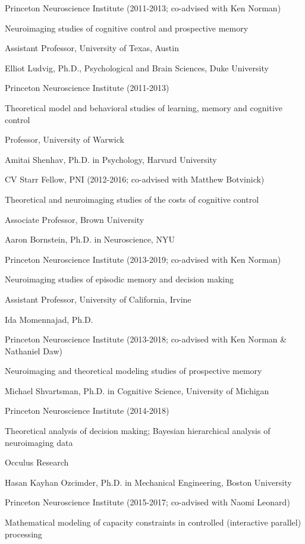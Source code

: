 \documentclass[10 pt]{article}
\begin{document}
Princeton Neuroscience Institute (2011-2013; co-advised with Ken Norman)

Neuroimaging studies of cognitive control and prospective memory

Assistant Professor, University of Texas, Austin
    \medskip

Elliot Ludvig, Ph.D., Psychological and Brain Sciences, Duke University

Princeton Neuroscience Institute (2011-2013)

Theoretical model and behavioral studies of learning, memory and cognitive control

Professor, University of Warwick
    \medskip

Amitai Shenhav, Ph.D. in Psychology, Harvard University

CV Starr Fellow, PNI (2012-2016; co-advised with Matthew Botvinick)

Theoretical and neuroimaging studies of the costs of cognitive control

Associate Professor, Brown University
    \medskip

Aaron Bornstein, Ph.D. in Neuroscience, NYU

Princeton Neuroscience Institute (2013-2019; co-advised with Ken Norman)

Neuroimaging studies of episodic memory and decision making

Assistant Professor, University of California, Irvine
    \medskip

Ida Momennajad, Ph.D.

Princeton Neuroscience Institute (2013-2018; co-advised with Ken Norman \& Nathaniel Daw)

Neuroimaging and theoretical modeling studies of prospective memory
    \medskip

Michael Shvartsman, Ph.D. in Cognitive Science, University of Michigan

Princeton Neuroscience Institute (2014-2018)

Theoretical analysis of decision making; Bayesian hierarchical analysis of neuroimaging data

Occulus Research
    \medskip

Hasan Kayhan Ozcimder, Ph.D. in Mechanical Engineering, Boston University

Princeton Neuroscience Institute (2015-2017; co-advised with Naomi Leonard)

Mathematical modeling of capacity constraints in controlled (interactive parallel) processing
\end{document}

